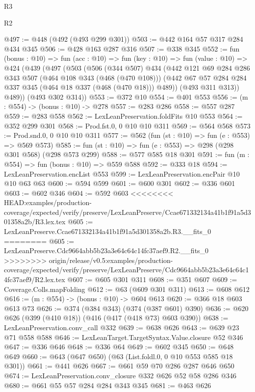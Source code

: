 \begin{lexlean}{R3}
\begin{lexlean}{R2}
\begin{coremodule}
{{{{{{{{{{{{{{{{{{{{{{@497 := @448 (@492 (@493 @299 @301))
@503 := @442 @164 @57 @317 @284 @434 @345
@506 := @428 @163 @287 @316
@507 := @338 @345
@552 := fun (bonus : @10) =>
  fun (acc : @10) =>
  fun (key : @10) =>
  fun (value : @10) =>
  @424
    (@439
      (@497
        (@503
          (@506
            (@344 @507)
            @434
            (@442
              @121
              @69
              @284
              @286
              @343
              @507
              (@464 @108 @343 (@468 (@470 @108)))
              (@442 @67 @57 @284 @284 @337 @345 (@464 @18 @337 (@468 (@470 @18))) @489))
            (@493 @311 @313))
          @489))
      (@493 @302 @314))
@553 := @372 @10
@554 := @401 @553
@556 := (m : @554) -> (bonus : @10) -> @278
@557 := @283 @286
@558 := @557 @287
@559 := @283 @558
@562 := LexLeanPreservation.foldFits @10 @553
@564 := @352 @299 @301
@568 := Prod.fst.{0, 0} @10 @10 @311
@569 := @564 @568
@573 := Prod.snd.{0, 0} @10 @10 @311
@577 := @562 (fun (st : @10) => fun (e : @553) => @569 @573)
@585 := fun (st : @10) => fun (e : @553) => @298 (@298 @301 @568) (@298 @573 @299)
@588 := @577 @585 @18 @301
@591 := fun (m : @554) => fun (bonus : @10) => @559 @588
@592 := @333 @18
@594 := LexLeanPreservation.encList @553
@599 := LexLeanPreservation.encPair @10 @10 @63 @63
@600 := @594 @599
@601 := @600 @301
@602 := @336 @601
@603 := @602 @346
@604 := @592 @603
<<<<<<<< HEAD:examples/production-coverage/expected/verify/preserve/LexLeanPreserve/Ccae671332134a41b1f91a5d301358a2b/R3.lex.tex
@605 := LexLeanPreserve.Ccae671332134a41b1f91a5d301358a2b.R3.__fits_0
========
@605 := LexLeanPreserve.Cdc9664abb5b23a3e64c64c14fc37aef9.R2.__fits_0
>>>>>>>> origin/release/v0.5:examples/production-coverage/expected/verify/preserve/LexLeanPreserve/Cdc9664abb5b23a3e64c64c14fc37aef9/R2.lex.tex
@607 := @605 @301 @311
@608 := @351 @607
@609 := Coverage.Colls.mapFolding
@612 := @63 (@609 @301 @311)
@613 := @608 @612
@616 := (m : @554) -> (bonus : @10) -> @604 @613
@620 := @366 @18 @603 @613 @73
@626 := @374 (@384 @343) (@374 (@387 @601) @390)
@636 := @620 @626 (@399 (@410 @18)) (@416 (@417 (@418 @73) @603 @390))
@638 := LexLeanPreservation.conv_call @332
@639 := @638 @626
@643 := @639 @23 @71 @558 @588
@646 := LexLeanTarget.TargetSyntax.Value.closure @52 @346
@647 := @336 @646
@648 := @336 @64
@649 := @602 @345
@650 := @648 @649
@660 := @643 (@647 @650) (@63 (List.foldl.{0, 0} @10 @553 @585 @18 @301))
@661 := @441 @626
@667 := @661 @59 @70 @286 @287 @646 @650
@674 := LexLeanPreservation.conv_closure @332 @626 @52 @58 @286 @346
@680 := @661 @55 @57 @284 @284 @343 @345
@681 := @463 @626
}}}}}}}}}}}}}}}}}}}}}}
\end{coremodule}
\end{lexlean}
\end{lexlean}
